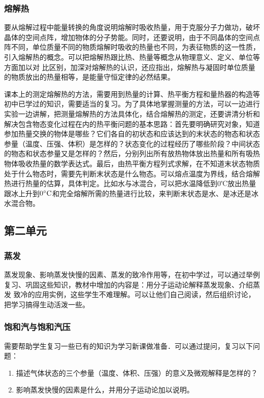 \subsubsection{熔解热}

要从熔解过程中能量转换的角度说明熔解时吸收热量，用于克服分子力做功，破坏晶体的空间点阵，增加物体的分子势能。同时，还要说明，由于不同晶体的空间点阵不同，单位质量不同的物质熔解时吸收的热量也不同，为表征物质的这一性质，引入熔解热的概念。可以把熔解热跟比热、热量等概念从物理意义、定义、单位等方面加以对
比区别，加深对熔解热的认识，还应指出，熔解热与凝固时单位质量的物质放出的热量相等，是能量守恒定律的必然结果。

课本上的测定熔解热的方法，需要用到热量的计算、热平衡方程和量热器的构造等初中已学过的知识，需要适当的复习。为了具体地掌握测量的方法，可以一边进行实验一边讲解，把测量熔解热的方法具体化，结合熔解热的测定，还要讲清分析和解决包含物态变化过程在内的热平衡问题的基本思路：首先要明确研究对象，知道参加热量交换的物体是哪些？它们各自的初状态和应该达到的末状态的物态和状态参量（温度、压强、体积）是怎样的？状态变化的过程经历了哪些阶段？中间状态的物态和状态参量又是怎样的？然后，分别列出所有放热物体放出热量和所有吸热物体吸收热量的数学表达式。最后，由热平衡方程列式求解，在不知道末状态物质处于什么物态时，需要先判断末状态是什么物态。可以熔点温度为界线，结合熔解热进行热量的估算，具体判定。比如水与冰混合，可以把水温降低到0℃放出热量跟冰上升到$0^{\circ}{\rm C}$和完全熔解所需的热量进行比较，来判断末状态是水、是冰还是冰水混合物。

\subsection{第二单元}
\subsubsection{蒸发}

蒸发现象、影响蒸发快慢的因素、蒸发的致冷作用等，在初中学过，可以通过举例复习、巩固这些知识，教材中增加的内容是：用分子运动论解释蒸发现象、介绍蒸发
致冷的应用实例，这些学生不难理解。可以让他们自己阅读，然后组织讨论，把学习搞得生动活泼一些。

\subsubsection{饱和汽与饱和汽压}

需要帮助学生复习一些已有的知识为学习新课做准备．可以通过提问，复习以下问题：
\begin{enumerate}
\item 描述气体状态的三个参量（温度、体积、压强）的意义及微观解释是怎样的？
\item 影响蒸发快慢的因素是什么，并用分子运动论加以说明。
\end{enumerate}

